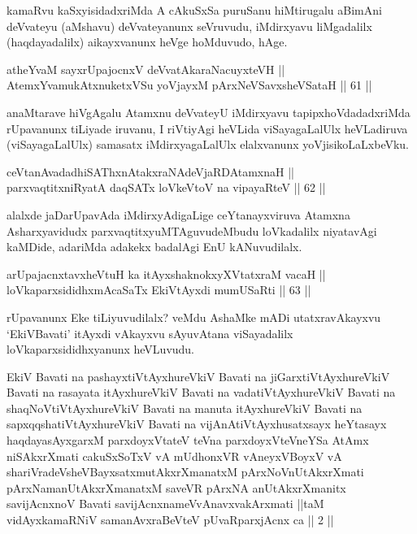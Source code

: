 \begin{artha}
kamaRvu kaSxyisidadxriMda A cAkuSxSa puruSanu hiMtirugalu aBimAni
deVvateyu (aMshavu) deVvateyanunx seVruvudu, iMdirxyavu liMgadalilx
(haqdayadalilx) aikayxvanunx heVge hoMduvudo, hAge.
\end{artha}

\begin{shl}
atheYvaM sayxrUpajocnxV deVvatAkaraNacuyxteVH ||  \\
AtemxYvamukAtxnuketxVSu yoVjayxM pArxNeVSavxsheVSataH \hfill || 61 ||  
\end{shl}

\begin{artha}
anaMtarave hiVgAgalu Atamxnu deVvateyU iMdirxyavu tapipxhoVdadadxriMda
rUpavanunx tiLiyade iruvanu, I riVtiyAgi heVLida viSayagaLalUlx
heVLadiruva (viSayagaLalUlx) samasatx iMdirxyagaLalUlx elalxvanunx
yoVjisikoLaLxbeVku.
\end{artha}

\begin{shl}
ceVtanAvadadhiSAThxnAtakxraNAdeVjaRDAtamxnaH || \\
parxvaqtitxniRyatA daqSATx loVkeV\s toV na vipayaRteV \hfill || 62 ||  
\end{shl}

\begin{artha}
alalxde jaDarUpavAda iMdirxyAdigaLige ceYtanayxviruva Atamxna
Asharxyavidudx parxvaqtitxyuMTAguvudeMbudu loVkadalilx niyatavAgi
kaMDide, adariMda adakekx badalAgi EnU kANuvudilalx.
\end{artha}

\begin{shl}
arUpajacnxtavxheVtuH ka itAyxshaknokxyXVtatxraM vacaH || \\
loVkaparxsididhxmAcaSaTx EkiVtAyxdi mumUSaRti \hfill || 63 ||  
\end{shl}

\begin{artha}
rUpavanunx Eke tiLiyuvudilalx? veMdu AshaMke mADi utatxravAkayxvu
`EkiVBavati' itAyxdi vAkayxvu sAyuvAtana viSayadalilx
loVkaparxsididhxyanunx heVLuvudu.
\end{artha}


\begin{shl}
EkiV Bavati na pashayxtiVtAyxhureVkiV Bavati na jiGarxtiVtAyxhureVkiV Bavati na rasayata itAyxhureVkiV Bavati na vadatiVtAyxhureVkiV Bavati na shaqNoVtiVtAyxhureVkiV Bavati na manuta itAyxhureVkiV Bavati na sapxqqshatiVtAyxhureVkiV Bavati na vijAnAtiVtAyxhusatxsayx heYtasayx haqdayasAyxgarxM parxdoyxVtateV teVna parxdoyxVteVneYSa AtAmx niSAkxrXmati cakuSxSoTxV vA mUdhonxVR vAneyxVBoyxV vA shariVradeVsheVBayxsatxmutAkxrXmanatxM pArxNoV\s nUtAkxrXmati pArxNamanUtAkxrXmanatxM saveVR pArxNA anUtAkxrXmanitx savijAcnxnoV Bavati savijAcnxnameVvAnavxvakArxmati ||taM vidAyxkamaRNiV samanAvxraBeVteV pUvaRparxjAcnx ca || 2 ||
\end{shl}

